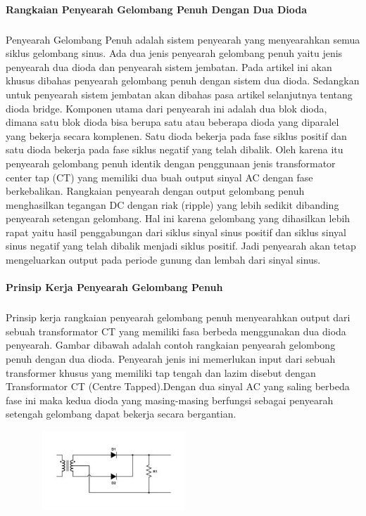 \documentclass[12pt,a4paper]{article}
\begin{document}
\paragraph{{Rangkaian Penyearah Gelombang Penuh Dengan Dua Dioda} }
\subparagraph{ }
	Penyearah Gelombang Penuh adalah sistem penyearah yang menyearahkan semua siklus gelombang sinus. Ada dua jenis penyearah gelombang penuh yaitu jenis penyearah dua dioda dan penyearah sistem jembatan. Pada artikel ini akan khusus dibahas penyearah gelombang penuh dengan sistem dua dioda. Sedangkan untuk penyearah sistem jembatan akan dibahas pasa artikel selanjutnya tentang dioda bridge.
	Komponen utama dari penyearah ini adalah dua blok dioda, dimana satu blok dioda bisa berupa satu atau beberapa dioda yang diparalel yang bekerja secara komplenen. Satu dioda bekerja pada fase siklus positif dan satu dioda bekerja pada fase siklus negatif yang telah dibalik.
	Oleh karena itu penyearah gelombang penuh identik dengan penggunaan jenis transformator center tap (CT) yang memiliki dua buah output sinyal AC dengan fase berkebalikan. Rangkaian penyearah dengan output gelombang penuh menghasilkan tegangan DC dengan riak (ripple) yang lebih sedikit dibanding penyearah setengan gelombang.
	Hal ini karena gelombang yang dihasilkan lebih rapat yaitu hasil penggabungan dari siklus sinyal sinus positif dan siklus sinyal sinus negatif yang telah dibalik menjadi siklus positif. Jadi penyearah akan tetap mengeluarkan output pada periode gunung dan lembah dari sinyal sinus.
\paragraph{ }
		\textbf{Prinsip Kerja Penyearah Gelombang Penuh}
\subparagraph{ }
	Prinsip kerja rangkaian penyearah gelombang penuh menyearahkan output dari sebuah transformator CT yang memiliki fasa berbeda menggunakan dua dioda penyearah. Gambar dibawah adalah contoh rangkaian penyearah gelombong penuh dengan dua dioda. Penyearah jenis ini memerlukan input dari sebuah transformer khusus yang memiliki tap tengah dan lazim disebut dengan Transformator CT (Centre Tapped).Dengan dua sinyal AC yang saling berbeda fase ini maka kedua dioda yang masing-masing berfungsi sebagai penyearah setengah gelombang dapat bekerja secara bergantian. 
	
	\begin{figure}
	\begin{center}
	\includegraphics[width=6cm, height=3cm]{g1dt.png}
	\end{center}
	\end{figure}
\end{document}
